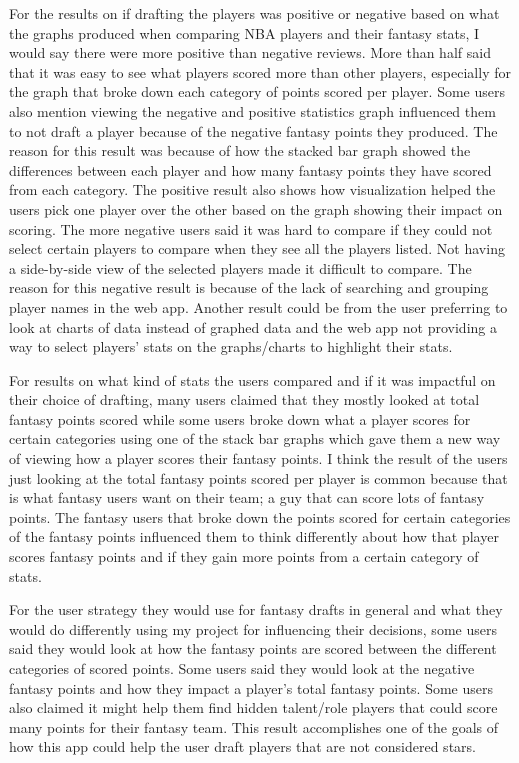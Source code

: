 \documentclass[10pt,twocolumn]{article}
\begin{document}
For the results on if drafting the players was positive or negative based on what the graphs produced when comparing NBA players and their fantasy stats, I would say there were more positive than negative reviews. More than half said that it was easy to see what players scored more than other players, especially for the graph that broke down each category of points scored per player. Some users also mention viewing the negative and positive statistics graph influenced them to not draft a player because of the negative fantasy points they produced. The reason for this result was because of how the stacked bar graph showed the differences between each player and how many fantasy points they have scored from each category. The positive result also shows how visualization helped the users pick one player over the other based on the graph showing their impact on scoring. The more negative users said it was hard to compare if they could not select certain players to compare when they see all the players listed. Not having a side-by-side view of the selected players made it difficult to compare. The reason for this negative result is because of the lack of searching and grouping player names in the web app. Another result could be from the user preferring to look at charts of data instead of graphed data and the web app not providing a way to select players' stats on the graphs/charts to highlight their stats.

For results on what kind of stats the users compared and if it was impactful on their choice of drafting, many users claimed that they mostly looked at total fantasy points scored while some users broke down what a player scores for certain categories using one of the stack bar graphs which gave them a new way of viewing how a player scores their fantasy points. I think the result of the users just looking at the total fantasy points scored per player is common because that is what fantasy users want on their team; a guy that can score lots of fantasy points. The fantasy users that broke down the points scored for certain categories of the fantasy points influenced them to think differently about how that player scores fantasy points and if they gain more points from a certain category of stats. 

For the user strategy they would use for fantasy drafts in general and what they would do differently using my project for influencing their decisions, some users said they would look at how the fantasy points are scored between the different categories of scored points. Some users said they would look at the negative fantasy points and how they impact a player's total fantasy points. Some users also claimed it might help them find hidden talent/role players that could score many points for their fantasy team. This result accomplishes one of the goals of how this app could help the user draft players that are not considered stars. 
\end{document}
